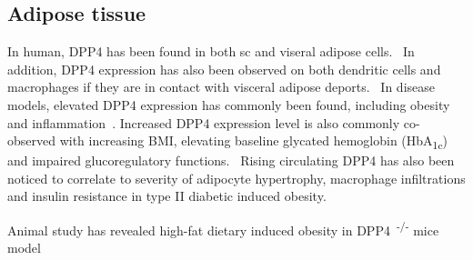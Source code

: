 \subsection{Adipose tissue}
In human, DPP4 has been found in both sc and viseral adipose cells.~\cite{Lamers2011} In addition, DPP4 expression has also been observed on both dendritic cells and macrophages if they are in contact with visceral adipose deports.~\cite{Zhong2013} In disease models, elevated DPP4 expression has commonly been found, including obesity and inflammation~\cite{Zhong2013}. Increased DPP4 expression level is also commonly co-observed with increasing BMI, elevating baseline glycated hemoglobin (HbA\textsubscript{1c})~\cite{2011} and impaired glucoregulatory functions.~\cite{Zhong2013,Sell2013} Rising circulating DPP4 has also been noticed to correlate to severity of adipocyte hypertrophy, macrophage infiltrations and insulin resistance in type II diabetic induced obesity.~\cite{Sell2013}  
\par 
Animal study has revealed high-fat dietary induced obesity in DPP4~\textsuperscript{-/-} mice model 